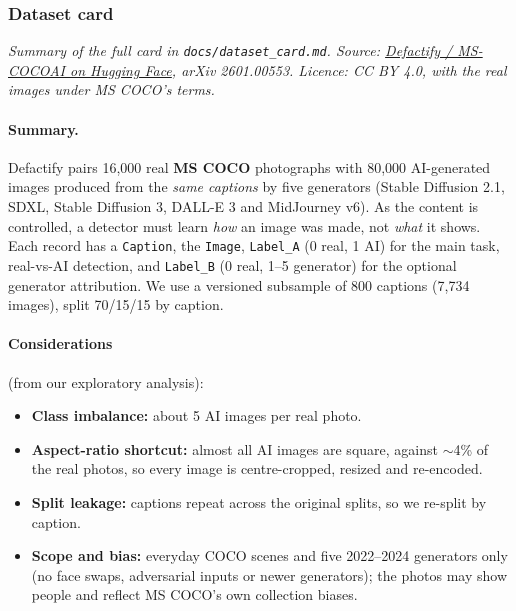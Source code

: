 \documentclass[11pt]{article}
\begin{document}
\subsubsection{Dataset card}
\textit{Summary of the full card in \texttt{docs/dataset\_card.md}. Source: \href{https://huggingface.co/datasets/Rajarshi-Roy-research/Defactify_Image_Dataset}{Defactify / MS-COCOAI on Hugging Face}, arXiv 2601.00553. Licence: CC BY 4.0, with the real images under MS COCO's terms.}

\paragraph{Summary.} Defactify pairs 16{,}000 real \textbf{MS COCO} photographs with 80{,}000 AI-generated images produced from the \emph{same captions} by five generators (Stable Diffusion 2.1, SDXL, Stable Diffusion 3, DALL-E 3 and MidJourney v6). As the content is controlled, a detector must learn \emph{how} an image was made, not \emph{what} it shows. Each record has a \texttt{Caption}, the \texttt{Image}, \texttt{Label\_A} (0 real, 1 AI) for the main task, real-vs-AI detection, and \texttt{Label\_B} (0 real, 1--5 generator) for the optional generator attribution. We use a versioned subsample of 800 captions (7{,}734 images), split 70/15/15 by caption.

\paragraph{Considerations} (from our exploratory analysis):


\begin{itemize}[nosep,leftmargin=1.4em]

\medskip

  \item \textbf{Class imbalance:} about 5 AI images per real photo.

\medskip

  \item \textbf{Aspect-ratio shortcut:} almost all AI images are square, against $\sim$4\% of the real photos, so every image is centre-cropped, resized and re-encoded.

\medskip

  \item \textbf{Split leakage:} captions repeat across the original splits, so we re-split by caption.

\medskip

  \item \textbf{Scope and bias:} everyday COCO scenes and five 2022--2024 generators only (no face swaps, adversarial inputs or newer generators); the photos may show people and reflect MS COCO's own collection biases.
\end{itemize}
\end{document}
